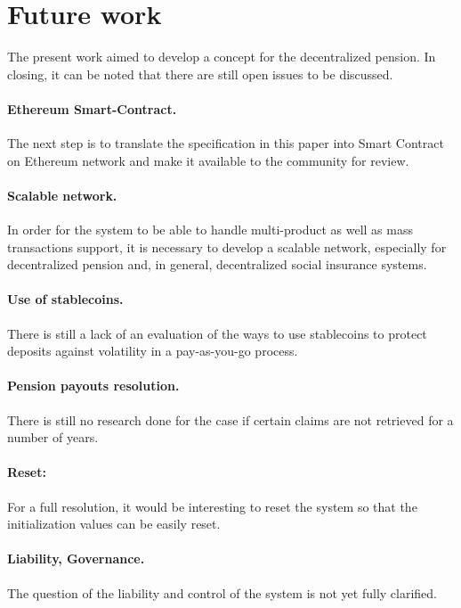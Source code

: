 \section{Future work}


The present work aimed to develop a concept for the decentralized pension. In closing, it can be noted that there are still open issues to be discussed.


\paragraph{Ethereum Smart-Contract.} The next step is to translate the specification in this paper into Smart Contract on Ethereum network and make it available to the community for review.

\paragraph{Scalable network.} In order for the system to be able to handle multi-product as well as mass transactions support, it is necessary to develop a scalable network, especially for decentralized pension and, in general, decentralized social insurance systems.

\paragraph{Use of stablecoins.} There is still a lack of an evaluation of the ways to use stablecoins  to protect deposits against volatility in a pay-as-you-go process.

\paragraph{Pension payouts resolution.} There is still no research done for the case if certain claims are not retrieved for a number of years.

\paragraph{Reset:} For a full resolution, it would be interesting to reset the system so that the initialization values can be easily reset.

\paragraph{Liability, Governance.} The question of the liability and control of the system is not yet fully clarified.

